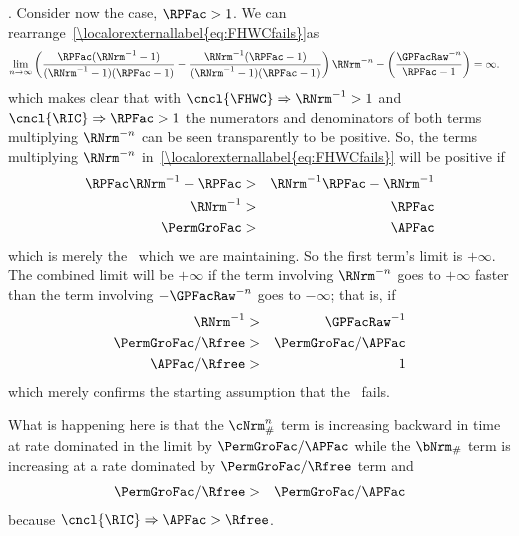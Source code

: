 \documentclass[\econtexRoot/BufferStockTheory]{subfiles}
\begin{document}
.  Consider now the \cncl{\RIC} case, $\RPFac > 1$.  We can rearrange~\eqref{\localorexternallabel{eq:FHWCfails}}as
\begin{eqnarray}
  \lim_{n \rightarrow \infty} \left(\frac{\RPFac(\RNrm^{-1}-1)}{(\RNrm^{-1}-1)(\RPFac-1)}-\frac{\RNrm^{-1}(\RPFac-1)}{(\RNrm^{-1}-1)(\RPFac-1)}\right)\RNrm^{-n}-\left(\frac{\GPFacRaw^{-n}}{\RPFac-1}\right)  & = \infty.  
\end{eqnarray}
which makes clear that with $\cncl{\FHWC} \Rightarrow \RNrm^{-1} > 1$ and $\cncl{\RIC} \Rightarrow \RPFac > 1$ the numerators and denominators of both terms multiplying $\RNrm^{-n}$ can be seen transparently to be positive.  So, the terms multiplying
$\RNrm^{-n}$ in~\eqref{\localorexternallabel{eq:FHWCfails}} will be positive if
\begin{eqnarray*}
  \RPFac \RNrm^{-1} - \RPFac  & > & \RNrm^{-1}\RPFac-\RNrm^{-1}
  \\ \RNrm^{-1}  & > & \RPFac
  \\ \PermGroFac  & > & \APFac
\end{eqnarray*}
which is merely the \GICRaw~which we are maintaining.  So the first term's limit is $+\infty$.  The
combined limit will be $+\infty$ if the term involving $\RNrm^{-n}$
goes to $+\infty$ faster than the term involving $-\GPFacRaw^{-n}$ goes to
$-\infty$; that is, if
\begin{eqnarray*}
  \RNrm^{-1}  & > & \GPFacRaw^{-1}
  \\ \PermGroFac/\Rfree  & > & \PermGroFac/\APFac
  \\ \APFac/\Rfree  & > & 1
\end{eqnarray*}
which merely confirms the starting assumption that the \RIC~fails.

What is happening here is that the $\cNrm_{\#}^{n}$ term is increasing backward in time at rate dominated in the limit by $\PermGroFac/\APFac$ while the $\bNrm_{\#}$ term is increasing at a rate dominated by $\PermGroFac/\Rfree$ term and
\begin{eqnarray}
  \PermGroFac/\Rfree & > & \PermGroFac/\APFac 
\end{eqnarray}
because $\cncl{\RIC} \Rightarrow \APFac > \Rfree$.
\end{document}
